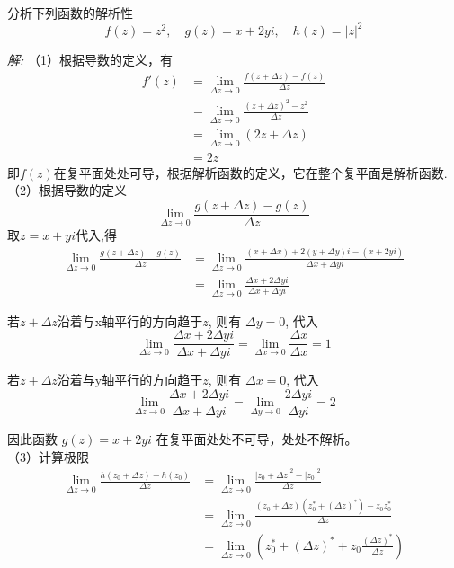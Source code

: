\begin{example}
    分析下列函数的解析性
  \[ f(z) = z^2, \quad  g(z) = x+ 2yi, \quad h(z) =\left\vert z\right\vert^2 \]
\end{example}
  \emph{解:} （1）根据导数的定义，有 
  \[ \begin{aligned}
    f'(z) &= \lim_{\Delta z \to 0 }  \frac{f(z +  \Delta z) - f(z)}{\Delta z} \\
    &= \lim_{\Delta z \to 0 }  \frac{(z +  \Delta z)^2 - z^2}{\Delta z} \\
    &=  \lim_{\Delta z \to 0 } (2z +  \Delta z) \\
    &= 2z
  \end{aligned}\]
  即$f(z)$在复平面处处可导，根据解析函数的定义，它在整个复平面是解析函数.\\
  （2）根据导数的定义
  \[\lim_{\Delta z \to 0 }  \frac{g(z +  \Delta z) - g(z)}{\Delta z} \]
  取$z= x+yi$代入,得
  \[ \begin{aligned}
    \lim_{\Delta z \to 0 }  \frac{g(z +  \Delta z) - g(z)}{\Delta z}  &= \lim_{\Delta z \to 0 }  \frac{(x +  \Delta x)  + 2(y +  \Delta y) i  - (x + 2y i )}{\Delta x + \Delta y i}  \\ 
    &= \lim_{\Delta z \to 0 } \frac{\Delta x + 2 \Delta y i} {\Delta x +  \Delta y i} 
  \end{aligned}\]
  \begin{inparaenum}[(i)]
    \item 若$z+ \Delta z$沿着与x轴平行的方向趋于$z$, 则有 $\Delta y =0$, 代入 
    \[ \lim_{\Delta z \to 0 } \frac{\Delta x + 2 \Delta y i} {\Delta x +  \Delta y i}  =  \lim_{\Delta x \to 0 } \frac{\Delta x } {\Delta x }  =1 \]
    \item 若$z+ \Delta z$沿着与y轴平行的方向趋于$z$, 则有 $\Delta x =0$, 代入 
    \[ \lim_{\Delta z \to 0 } \frac{\Delta x + 2 \Delta y i} {\Delta x +  \Delta y i}  =  \lim_{\Delta y \to 0 } \frac{2 \Delta y i } {\Delta y i }  =2 \]
\end{inparaenum}
因此函数 $g(z) = x + 2y i$ 在复平面处处不可导，处处不解析。\\
（3）计算极限
  \[ \begin{aligned}
    \lim_{\Delta z \to 0 }  \frac{h(z_0 +  \Delta z) - h(z_0)}{\Delta z}  
    &=   \lim_{\Delta z \to 0 }  \frac{ \left\vert z_0 +  \Delta z \right\vert^2  - \left\vert z_0 \right\vert^2 }{\Delta z}  \\
    &=   \lim_{\Delta z \to 0 } \frac{(z_0 +  \Delta z) (z_0^* +  (\Delta z)^*) - z_0z_0 ^* }{\Delta z} \\
    &= \lim_{\Delta z \to 0 } \left( z_0^* + (\Delta z)^* + z_0\frac{(\Delta z)^*}{\Delta z}\right)
  \end{aligned}\]

